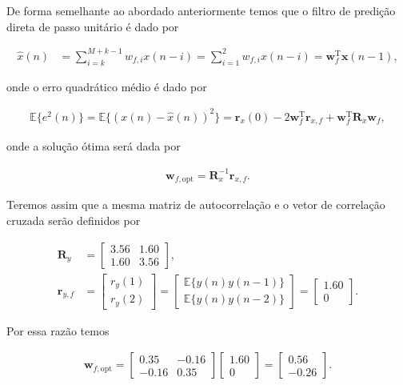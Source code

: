 De forma semelhante ao abordado anteriormente temos que o filtro de predição direta de passo unitário é dado por

\begin{align}
    \hat{x}(n) &= \sum^{M + k - 1}_{i = k} w_{f,i} x(n - i) = \sum^{2}_{i = 1} w_{f,i} x(n - i) = \mathbf{w}^{\text{T}}_{f} \mathbf{x}(n - 1),
\end{align}

onde o erro quadrático médio é dado por

\begin{align}
    \mathbb{E}\{e^{2}(n)\} = \mathbb{E}\{(x(n) - \hat{x}(n) )^{2}\} = \mathbf{r}_{x}(0) - 2 \mathbf{w}^{\text{T}}_{f} \mathbf{r}_{x,f} + \mathbf{w}^{\text{T}}_{f} \mathbf{R}_{x} \mathbf{w}_{f},
\end{align}

onde a solução ótima será dada por

\begin{align}
    \mathbf{w}_{f,\text{opt}} = \mathbf{R}^{-1}_{x} \mathbf{r}_{x,f}.
\end{align}

Teremos assim que a mesma matriz de autocorrelação e o vetor de correlação cruzada serão definidos por

\begin{align}
    \mathbf{R}_{y} &=
    \begin{bmatrix}
        3.56 & 1.60 \\
        1.60 & 3.56
    \end{bmatrix}, \\
    \mathbf{r}_{y,f} &= 
    \begin{bmatrix}
        r_{y}(1) \\
        r_{y}(2)
    \end{bmatrix} =
    \begin{bmatrix}
        \mathbb{E}\{y(n) y(n - 1)\} \\
        \mathbb{E}\{y(n) y(n - 2)\}
    \end{bmatrix} = 
    \begin{bmatrix}
        1.60 \\
        0
    \end{bmatrix}.
\end{align}

Por essa razão temos

\begin{align}
    \mathbf{w}_{f,\text{opt}} = 
    \begin{bmatrix}
        0.35 & -0.16 \\
        -0.16 & 0.35
    \end{bmatrix}
    \begin{bmatrix}
        1.60 \\
        0
    \end{bmatrix} =
    \begin{bmatrix}
        0.56 \\
        -0.26
    \end{bmatrix}.
\end{align}

